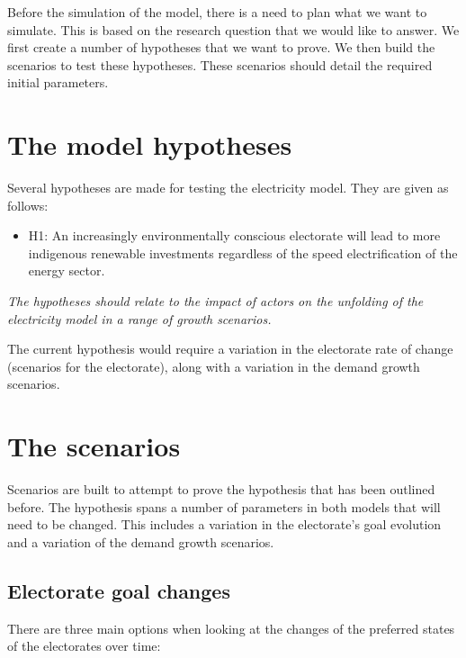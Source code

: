 Before the simulation of the model, there is a need to plan what we want to simulate. This is based on the research question that we would like to answer. We first create a number of hypotheses that we want to prove. We then build the scenarios to test these hypotheses. These scenarios should detail the required initial parameters.


\section{The model hypotheses}
\label{sec:hypotheses}

Several hypotheses are made for testing the electricity model. They are given as follows:

\begin{itemize}
\item H1: An increasingly environmentally conscious electorate will lead to more indigenous renewable investments regardless of the speed electrification of the energy sector.
\end{itemize}


\emph{The hypotheses should relate to the impact of actors on the unfolding of the electricity model in a range of growth scenarios.}

The current hypothesis would require a variation in the electorate rate of change (scenarios for the electorate), along with a variation in the demand growth scenarios.



\section{The scenarios}
\label{sec:scenarios}

Scenarios are built to attempt to prove the hypothesis that has been outlined before. The hypothesis spans a number of parameters in both models that will need to be changed. This includes a variation in the electorate's goal evolution and a variation of the demand growth scenarios.

\subsection{Electorate goal changes}

There are three main options when looking at the changes of the preferred states of the electorates over time:


